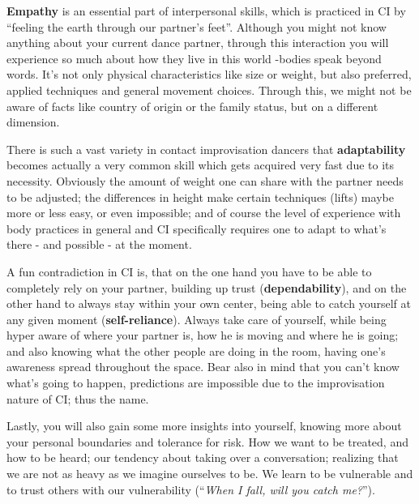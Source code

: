 \textbf{Empathy} is an essential part of interpersonal skills, which is practiced in CI by ``feeling the earth through our partner's feet''.
Although you might not know anything about your current dance partner, through this interaction you will experience so much about how they live in this world -bodies speak beyond words.
It's not only physical characteristics like size or weight, but also preferred, applied techniques and general movement choices.
Through this, we might not be aware of facts like country of origin or the family status, but on a different dimension.

There is such a vast variety in contact improvisation dancers that \textbf{adaptability} becomes actually a very common skill which gets acquired very fast due to its necessity.
Obviously the amount of weight one can share with the partner needs to be adjusted; the differences in height make certain techniques (lifts) maybe more or less easy, or even impossible; and of course the level of experience with body practices in general and CI specifically requires one to adapt to what's there - and possible - at the moment.

A fun contradiction in CI is, that on the one hand you have to be able to completely rely on your partner, building up trust (\textbf{dependability}), and on the other hand to always stay within your own center, being able to catch yourself at any given moment (\textbf{self-reliance}).
Always take care of yourself, while being hyper aware of where your partner is, how he is moving and where he is going; and also knowing what the other people are doing in the room, having one's awareness spread throughout the space.
Bear also in mind that you can't know what's going to happen, predictions are impossible due to the improvisation nature of CI; thus the name.

Lastly, you will also gain some more insights into yourself, knowing more about your personal boundaries and tolerance for risk.
How we want to be treated, and how to be heard; our tendency about taking over a conversation; realizing that we are not as heavy as we imagine ourselves to be.
We learn to be vulnerable and to trust others with our vulnerability (``\textit{When I fall, will you catch me?}'').
